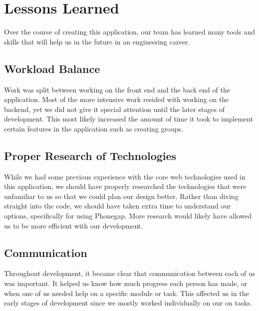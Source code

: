 \chapter{Lessons Learned}
Over the course of creating this application, our team has learned many tools and skills that will help us in the future in an engineering career.

\section{Workload Balance}
Work was split between working on the front end and the back end of the application. Most of the more intensive work resided with working on the backend, yet we did not give it special attention until the later stages of development. This most likely increased the amount of time it took to implement certain features in the application such as creating groups.

\section{Proper Research of Technologies}
While we had some previous experience with the core web technologies used in this application, we should have properly researched the technologies that were unfamiliar to us so that we could plan our design better. Rather than diving straight into the code, we should have taken extra time to understand our options, specifically for using Phonegap. More research would likely have allowed us to be more efficient with our development.

\section{Communication}
Throughout development, it became clear that communication between each of us was important. It helped us know how much progress each person has made, or when one of us needed help on a specific module or task. This affected us in the early stages of development since we mostly worked individually on our on tasks.